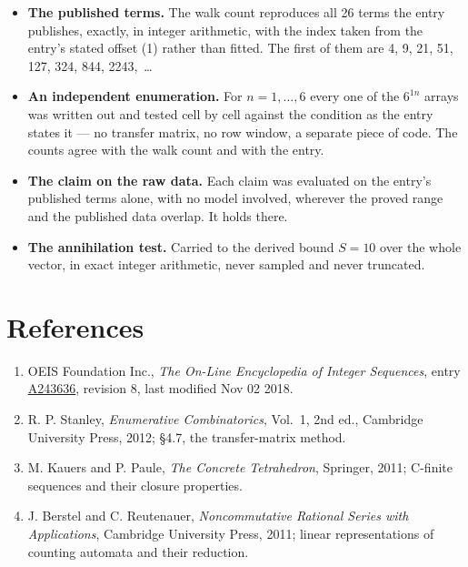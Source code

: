 \documentclass[11pt]{article}
\theoremstyle{definition}
\begin{document}
\begin{itemize}

\item {\bfseries The published terms.} The walk count reproduces all 26 terms the entry publishes, exactly, in integer arithmetic, with the index taken from the entry's stated offset (1) rather than fitted. The first of them are 4, 9, 21, 51, 127, 324, 844, 2243,~\dots

\item {\bfseries An independent enumeration.} For $n = 1,\dots,6$ every one of the $6^{1n}$ arrays was written out and tested cell by cell against the condition as the entry states it --- no transfer matrix, no row window, a separate piece of code. The counts agree with the walk count and with the entry.

\item {\bfseries The claim on the raw data.} Each claim was evaluated on the entry's published terms alone, with no model involved, wherever the proved range and the published data overlap. It holds there.

\item {\bfseries The annihilation test.} Carried to the derived bound $S = 10$ over the whole vector, in exact integer arithmetic, never sampled and never truncated.

\end{itemize}

\section{References}

\begin{enumerate}

\item OEIS Foundation Inc., \emph{The On-Line Encyclopedia of Integer Sequences}, entry \href{https://oeis.org/A243636}{A243636}, revision 8, last modified Nov 02 2018.

\item R. P. Stanley, \emph{Enumerative Combinatorics}, Vol.~1, 2nd ed., Cambridge University Press, 2012; \S4.7, the transfer-matrix method.

\item M. Kauers and P. Paule, \emph{The Concrete Tetrahedron}, Springer, 2011; C-finite sequences and their closure properties.

\item J. Berstel and C. Reutenauer, \emph{Noncommutative Rational Series with Applications}, Cambridge University Press, 2011; linear representations of counting automata and their reduction.

\end{enumerate}
\end{document}
